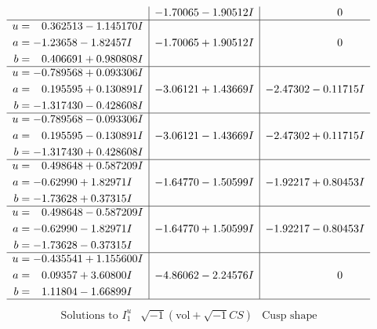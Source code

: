 \documentclass[1p]{elsarticle_modified}
\theoremstyle{definition}
\newcommand{\I}{\sqrt{-1}}
\begin{document}
$$\begin{array}{c|c|c}
 & -1.70065 - 1.90512 I & \phantom{-0.000000 } 0 \\ \hline\begin{aligned}
u &= \phantom{-}0.362513 - 1.145170 I \\
a &= -1.23658 - 1.82457 I \\
b &= \phantom{-}0.406691 + 0.980808 I\end{aligned}
 & -1.70065 + 1.90512 I & \phantom{-0.000000 } 0 \\ \hline\begin{aligned}
u &= -0.789568 + 0.093306 I \\
a &= \phantom{-}0.195595 + 0.130891 I \\
b &= -1.317430 - 0.428608 I\end{aligned}
 & -3.06121 + 1.43669 I & -2.47302 - 0.11715 I \\ \hline\begin{aligned}
u &= -0.789568 - 0.093306 I \\
a &= \phantom{-}0.195595 - 0.130891 I \\
b &= -1.317430 + 0.428608 I\end{aligned}
 & -3.06121 - 1.43669 I & -2.47302 + 0.11715 I \\ \hline\begin{aligned}
u &= \phantom{-}0.498648 + 0.587209 I \\
a &= -0.62990 + 1.82971 I \\
b &= -1.73628 + 0.37315 I\end{aligned}
 & -1.64770 - 1.50599 I & -1.92217 + 0.80453 I \\ \hline\begin{aligned}
u &= \phantom{-}0.498648 - 0.587209 I \\
a &= -0.62990 - 1.82971 I \\
b &= -1.73628 - 0.37315 I\end{aligned}
 & -1.64770 + 1.50599 I & -1.92217 - 0.80453 I \\ \hline\begin{aligned}
u &= -0.435541 + 1.155600 I \\
a &= \phantom{-}0.09357 + 3.60800 I \\
b &= \phantom{-}1.11804 - 1.66899 I\end{aligned}
 & -4.86062 - 2.24576 I & \phantom{-0.000000 } 0\\
 \hline 
 \end{array}$$\newpage$$\begin{array}{c|c|c}  
\text{Solutions to }I^u_{1}& \I (\text{vol} + \sqrt{-1}CS) & \text{Cusp shape}\\

\end{array}$$
\end{document}

